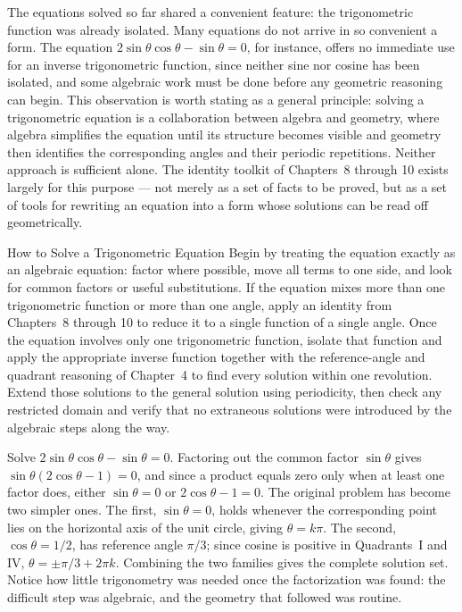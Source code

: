 The equations solved so far shared a convenient feature: the trigonometric
function was already isolated. Many equations do not arrive in so
convenient a form. The equation $2\sin\theta\cos\theta - \sin\theta = 0$,
for instance, offers no immediate use for an inverse trigonometric
function, since neither sine nor cosine has been isolated, and some
algebraic work must be done before any geometric reasoning can begin. This
observation is worth stating as a general principle: solving a
trigonometric equation is a collaboration between algebra and geometry,
where algebra simplifies the equation until its structure becomes visible
and geometry then identifies the corresponding angles and their periodic
repetitions. Neither approach is sufficient alone. The identity toolkit of
Chapters~8 through 10 exists largely for this purpose --- not merely as a
set of facts to be proved, but as a set of tools for rewriting an equation
into a form whose solutions can be read off geometrically.

\begin{algorithmproc}{How to Solve a Trigonometric Equation}
Begin by treating the equation exactly as an algebraic equation: factor
where possible, move all terms to one side, and look for common factors or
useful substitutions. If the equation mixes more than one trigonometric
function or more than one angle, apply an identity from Chapters~8 through
10 to reduce it to a single function of a single angle. Once the equation
involves only one trigonometric function, isolate that function and apply
the appropriate inverse function together with the reference-angle and
quadrant reasoning of Chapter~4 to find every solution within one
revolution. Extend those solutions to the general solution using
periodicity, then check any restricted domain and verify that no
extraneous solutions were introduced by the algebraic steps along the way.
\end{algorithmproc}

\begin{example}
Solve $2\sin\theta\cos\theta - \sin\theta = 0$. Factoring out the common
factor $\sin\theta$ gives $\sin\theta(2\cos\theta - 1) = 0$, and since a
product equals zero only when at least one factor does, either
$\sin\theta = 0$ or $2\cos\theta - 1 = 0$. The original problem has become
two simpler ones. The first, $\sin\theta = 0$, holds whenever the
corresponding point lies on the horizontal axis of the unit circle, giving
$\theta = k\pi$. The second, $\cos\theta = 1/2$, has reference angle
$\pi/3$; since cosine is positive in Quadrants~I and IV,
$\theta = \pm\pi/3 + 2\pi k$. Combining the two families gives the
complete solution set. Notice how little trigonometry was needed once the
factorization was found: the difficult step was algebraic, and the
geometry that followed was routine.
\end{example}

